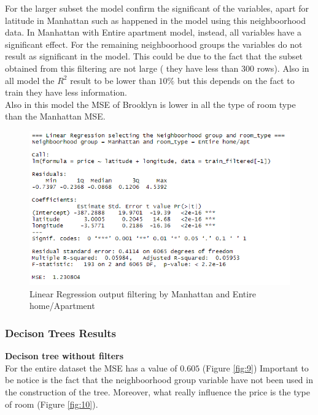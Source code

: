 \documentclass{FR16}
\begin{document}
For the larger subset the model confirm the significant of the variables, apart for latitude in Manhattan such as happened in the model using this neighboorhood data. In Manhattan with Entire apartment model, instead, all variables have a significant effect. For the remaining neighboorhood groups the variables do not result as significant in the model. This could be due to the fact that the subset obtained from this filtering are not large ( they have less than 300 rows). Also in all model the $R^2$ result to be lower than $10\%$ but this depends on the fact to train they have less information.
\\
Also in this model the MSE of Brooklyn is lower in all the type of room type than the Manhattan MSE. 
\begin{figure}[H]
\centering
\includegraphics[width=1\textwidth]{figures/lm3.PNG} 
\caption{\label{fig:7}  Linear Regression output filtering by  Manhattan and Entire home/Apartment }
\end{figure}




\newpage 
\subsubsection{Decison Trees Results}
\textbf{Decison tree  without filters}\\
\noindent For the entire dataset the MSE has a value of $0.605$ (Figure \ref{fig:9}) Important to be notice is the fact that the neighboorhood group variable have not been used in the construction of the tree. Moreover, what really influence the price is the type of room (Figure \ref{fig:10}).
\end{document}

